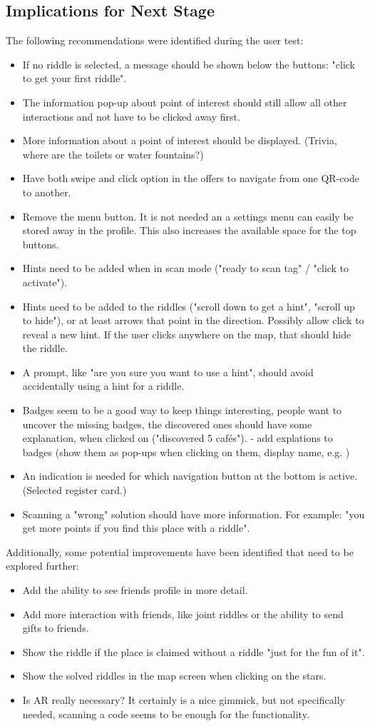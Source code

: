 \documentclass[10pt,twocolumn]{article} %
\begin{document}
\subsection*{Implications for Next Stage}
The following recommendations were identified during the user test:
\begin{itemize}[noitemsep]
  \item If no riddle is selected, a message should be shown below the buttons: "click to get your first riddle".
  \item The information pop-up about point of interest should still allow all other interactions and not have to be clicked away first.  
  \item More information about a point of interest should be displayed. (Trivia, where are the toilets or water fountains?)
  \item Have both swipe and click option in the offers to navigate from one QR-code to another.
  \item Remove the menu button. It is not needed an a settings menu can easily be stored away in the profile. This also increases the available space for the top buttons.  
  \item Hints need to be added when in scan mode ("ready to scan tag" / "click to activate").
  \item Hints need to be added to the riddles ("scroll down to get a hint", "scroll up to hide"), or at least arrows that point in the direction. Possibly allow click to reveal a new hint. If the user clicks anywhere on the map, that should hide the riddle.
  \item A prompt, like "are you sure you want to use a hint", should avoid accidentally using a hint for a riddle.
  \item Badges seem to be a good way to keep things interesting, people want to uncover the missing badges, the discovered ones should have some explanation, when clicked on ("discovered 5 cafés").
- add explations to badges (show them as pop-ups when clicking on them, display name, e.g. )
  \item An indication is needed for which navigation button at the bottom is active.(Selected register card.)
  \item Scanning a "wrong" solution should have more information. For example: "you get more points if you find this place with a riddle".
\end{itemize}
Additionally, some potential improvements have been identified that need to be explored further:
\begin{itemize}[noitemsep]
  \item Add the ability to see friends profile in more detail.
  \item Add more interaction with friends, like joint riddles or the ability to send gifts to friends.
  \item Show the riddle if the place is claimed without a riddle "just for the fun of it".
  \item Show the solved riddles in the map screen when clicking on the stars.
  \item Is AR really necessary? It certainly is a nice gimmick, but not specifically needed, scanning a code seems to be enough for the functionality.
\end{itemize}
\end{document}
